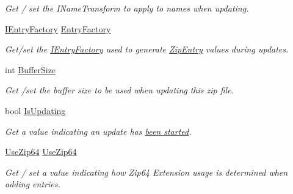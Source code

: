 \begin{DoxyCompactItemize}
\begin{DoxyCompactList}\small\item\em Get / set the I\+Name\+Transform to apply to names when updating. \end{DoxyCompactList}\item 
\hyperlink{interface_i_c_sharp_code_1_1_sharp_zip_lib_1_1_zip_1_1_i_entry_factory}{I\+Entry\+Factory} \hyperlink{class_i_c_sharp_code_1_1_sharp_zip_lib_1_1_zip_1_1_zip_file_a5786be6c46d601fa458a8ec5220a0250}{Entry\+Factory}
\begin{DoxyCompactList}\small\item\em Get/set the \hyperlink{interface_i_c_sharp_code_1_1_sharp_zip_lib_1_1_zip_1_1_i_entry_factory}{I\+Entry\+Factory} used to generate \hyperlink{class_i_c_sharp_code_1_1_sharp_zip_lib_1_1_zip_1_1_zip_entry}{Zip\+Entry} values during updates. \end{DoxyCompactList}\item 
int \hyperlink{class_i_c_sharp_code_1_1_sharp_zip_lib_1_1_zip_1_1_zip_file_aa9f27297380a2f4bcbb1f2c48ebb9a6a}{Buffer\+Size}
\begin{DoxyCompactList}\small\item\em Get /set the buffer size to be used when updating this zip file. \end{DoxyCompactList}\item 
bool \hyperlink{class_i_c_sharp_code_1_1_sharp_zip_lib_1_1_zip_1_1_zip_file_aeb3ac5f00ce8045355642877cd2c8c42}{Is\+Updating}
\begin{DoxyCompactList}\small\item\em Get a value indicating an update has \hyperlink{class_i_c_sharp_code_1_1_sharp_zip_lib_1_1_zip_1_1_zip_file_a938dbbc553b0dc77b2c4914cec1da8a5}{been started}. \end{DoxyCompactList}\item 
\hyperlink{namespace_i_c_sharp_code_1_1_sharp_zip_lib_1_1_zip_aaa66f18625e7ce19069972caf7bc69a0}{Use\+Zip64} \hyperlink{class_i_c_sharp_code_1_1_sharp_zip_lib_1_1_zip_1_1_zip_file_a5abc49fe727b4512770ced75fe0409c4}{Use\+Zip64}
\begin{DoxyCompactList}\small\item\em Get / set a value indicating how Zip64 Extension usage is determined when adding entries. \end{DoxyCompactList}\end{DoxyCompactItemize}


